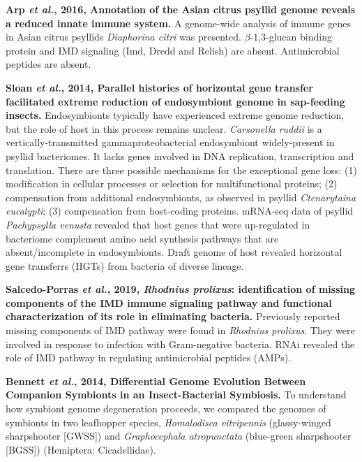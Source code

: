 \documentclass[11pt]{article}
\begin{document}
\begin{sloppypar}
\par
\textbf{Arp \textit{et al.}, 2016, Annotation of the Asian citrus psyllid genome reveals a reduced innate immune system.}
A genome-wide analysis of immune genes in Asian citrus psyllids \textit{Diaphorina citri} was presented. 
$\beta$-1,3-glucan binding protein and IMD signaling (Imd, Dredd and Relish) are absent. 
Antimicrobial peptides are absent. 
\par
\textbf{Sloan \textit{et al.}, 2014, Parallel histories of horizontal gene transfer facilitated extreme reduction of endosymbiont genome in sap-feeding insects.} \newline
Endosymbionts typically have experienced extreme genome reduction, but the role of host in this process remains unclear. 
\textit{Carsonella ruddii} is a vertically-transmitted gammaproteobacterial endosymbiont widely-present in psyllid bacteriomes. 
It lacks genes involved in DNA replication, transcription and translation. 
There are three possible mechanisms for the exceptional gene loss: 
(1) modification in cellular processes or selection for multifunctional proteins; 
(2) compensation from additional endosymbionts, as observed in psyllid \textit{Ctenarytaina eucalypti}; 
(3) compensation from host-coding proteins. 
mRNA-seq data of psyllid \textit{Pachypsylla venusta} revealed that host genes that were up-regulated in bacteriome complement amino acid synthesis pathways that are absent/incomplete in endosymbionts. 
Draft genome of host revealed horizontal gene transferrs (HGTs) from bacteria of diverse lineage. 
\par
\textbf{Salcedo-Porras \textit{et al.}, 2019, \textit{Rhodnius prolixus}: identification of missing components of the IMD immune signaling pathway and functional characterization of its role in eliminating bacteria.}
Previously reported missing components of IMD pathway were found in \textit{Rhodnius prolixus}. 
They were involved in response to infection with Gram-negative bacteria. 
RNAi revealed the role of IMD pathway in regulating antimicrobial peptides (AMPs). 
\par
\textbf{Bennett \textit{et al.}, 2014, Differential Genome Evolution Between Companion Symbionts in an Insect-Bacterial Symbiosis.} \newline
To understand how symbiont genome degeneration proceeds, we compared the genomes of symbionts in two leafhopper species, \textit{Homalodisca vitripennis} (glassy-winged sharpshooter [GWSS]) and \textit{Graphocephala atropunctata} (blue-green sharpshooter [BGSS]) (Hemiptera: Cicadellidae). 

\end{sloppypar}
\end{document}

